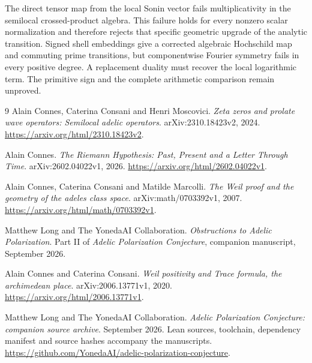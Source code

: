 \documentclass[11pt,letterpaper]{article}
\theoremstyle{definition}
\theoremstyle{remark}
\begin{document}
The direct tensor map from the local Sonin vector fails
multiplicativity in the semilocal crossed-product algebra.
This failure holds for every nonzero scalar normalization and
therefore rejects that specific geometric upgrade of the
analytic transition. Signed shell embeddings give a corrected
algebraic Hochschild map and commuting prime transitions,
but componentwise Fourier symmetry fails in every positive
degree. A replacement duality must recover the local
logarithmic term. The primitive sign and the complete
arithmetic comparison remain unproved.

\begin{thebibliography}{9}
\small
{}
Alain Connes, Caterina Consani and Henri Moscovici.
\emph{Zeta zeros and prolate wave operators: Semilocal adelic operators}.
arXiv:2310.18423v2, 2024.
\url{https://arxiv.org/html/2310.18423v2}.

Alain Connes.
\emph{The Riemann Hypothesis: Past, Present and a Letter Through Time}.
arXiv:2602.04022v1, 2026.
\url{https://arxiv.org/html/2602.04022v1}.

Alain Connes, Caterina Consani and Matilde Marcolli.
\emph{The Weil proof and the geometry of the adeles class space}.
arXiv:math/0703392v1, 2007.
\url{https://arxiv.org/html/math/0703392v1}.

Matthew Long and The YonedaAI Collaboration.
\emph{Obstructions to Adelic Polarization}.
Part II of \emph{Adelic Polarization Conjecture}, companion manuscript,
September 2026.

Alain Connes and Caterina Consani.
\emph{Weil positivity and Trace formula, the archimedean place}.
arXiv:2006.13771v1, 2020.
\url{https://arxiv.org/html/2006.13771v1}.

Matthew Long and The YonedaAI Collaboration.
\emph{Adelic Polarization Conjecture: companion source archive}.
September 2026. Lean sources, toolchain, dependency manifest
and source hashes accompany the manuscripts.
\url{https://github.com/YonedaAI/adelic-polarization-conjecture}.
\end{thebibliography}
\end{document}
